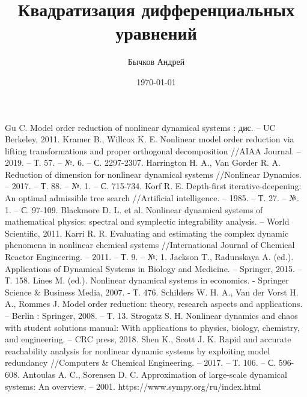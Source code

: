 \documentclass[a4paper,14pt]{article}
\author{Бычков Андрей}
\title{Квадратизация дифференциальных уравнений}
\date{\today}
\begin{document}
 


\tableofcontents








\begin{thebibliography}{9}
 Gu C. Model order reduction of nonlinear dynamical systems : дис. – UC Berkeley, 2011.
 Kramer B., Willcox K. E. Nonlinear model order reduction via lifting transformations and proper orthogonal decomposition //AIAA Journal. – 2019. – Т. 57. – №. 6. – С. 2297-2307.
 Harrington H. A., Van Gorder R. A. Reduction of dimension for nonlinear dynamical systems //Nonlinear Dynamics. – 2017. – Т. 88. – №. 1. – С. 715-734.
 Korf R. E. Depth-first iterative-deepening: An optimal admissible tree search //Artificial intelligence. – 1985. – Т. 27. – №. 1. – С. 97-109.
 Blackmore D. L. et al. Nonlinear dynamical systems of mathematical physics: spectral and symplectic integrability analysis. – World Scientific, 2011.
 Karri R. R. Evaluating and estimating the complex dynamic phenomena in nonlinear chemical systems //International Journal of Chemical Reactor Engineering. – 2011. – Т. 9. – №. 1.
 Jackson T., Radunskaya A. (ed.). Applications of Dynamical Systems in Biology and Medicine. – Springer, 2015. – Т. 158.
 Lines M. (ed.). Nonlinear dynamical systems in economics. - Springer Science \& Business Media, 2007. - Т. 476.
 Schilders W. H. A., Van der Vorst H. A., Rommes J. Model order reduction: theory, research aspects and applications. – Berlin : Springer, 2008. – Т. 13.
 Strogatz S. H. Nonlinear dynamics and chaos with student solutions manual: With applications to physics, biology, chemistry, and engineering. – CRC press, 2018.
 Shen K., Scott J. K. Rapid and accurate reachability analysis for nonlinear dynamic systems by exploiting model redundancy //Computers \& Chemical Engineering. – 2017. – Т. 106. – С. 596-608.
 Antoulas A. C., Sorensen D. C. Approximation of large-scale dynamical systems: An overview. – 2001.
 https://www.sympy.org/ru/index.html

\end{thebibliography}
\end{document}
